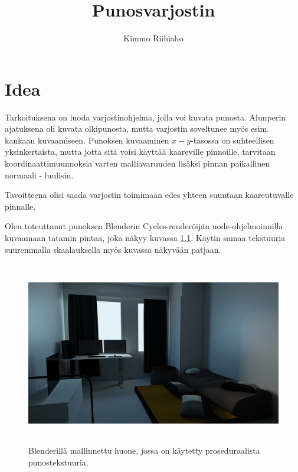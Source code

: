 \documentclass[utf8,bachelor]{gradu3}
\begin{document}
\title{Punosvarjostin}



\author{Kimmo Riihiaho}
\type{} %

\maketitle

\mainmatter

\chapter{Idea}

Tarkoituksena on luoda varjostinohjelma, jolla voi kuvata punosta. Alunperin ajatuksena oli kuvata olkipunosta, mutta varjostin soveltunee myös esim. kankaan kuvaamiseen. Punoksen kuvaaminen $x-y$-tasossa on suhteellisen yksinkertaista, mutta jotta sitä voisi käyttää kaareville pinnoille, tarvitaan koordinaattimuunnoksia varten malliavaruuden lisäksi pinnan paikallinen normaali - luulisin.

Tavoitteena olisi saada varjostin toimimaan edes yhteen suuntaan kaareutuvalle pinnalle.  

Olen toteuttanut punoksen Blenderin Cycles-renderöijän node-ohjelmoinnilla kuvaamaan tatamin pintaa, joka näkyy kuvassa \ref{fig:room}. Käytin samaa tekstuuria suuremmalla skaalauksella myös kuvassa näkyvään patjaan.

\begin{figure}[h] 
	\centering
	\includegraphics[height=8cm]{day1.png}
	\caption{Blenderillä mallinnettu huone, jossa on käytetty proseduraalista punostekstuuria.}
	\label{fig:room}
\end{figure}
\end{document}
